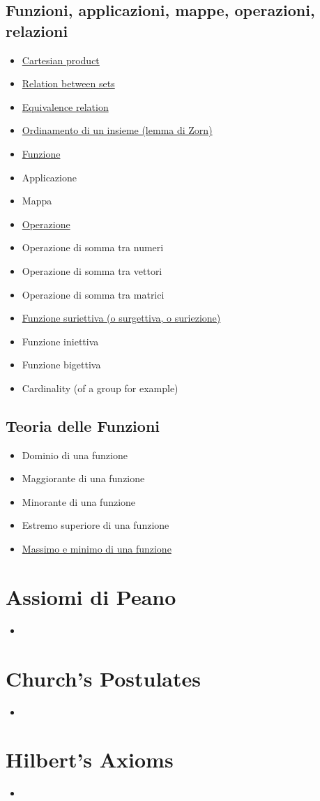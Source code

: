 \documentclass[a4paper,10pt]{article}
\begin{document}
\subsection*{Funzioni, applicazioni, mappe, operazioni, relazioni}
\begin{itemize}
 \item \href{CartesianProduct.pdf}{Cartesian product}
 \item \href{Relation.pdf}{Relation between sets}
 \item \href{EquivalenceRelation.pdf}{Equivalence relation}
 \item \href{OrdinamentoInsieme.pdf}{Ordinamento di un insieme (lemma di Zorn)}
 \item \href{Function.pdf}{Funzione}
 \item Applicazione
 \item Mappa
 \item \href{Operazione.pdf}{Operazione}
 \item Operazione di somma tra numeri
 \item Operazione di somma tra vettori
 \item Operazione di somma tra matrici
 \item \href{./FunzioneSuriettiva.pdf}{Funzione suriettiva (o surgettiva, o suriezione)}
 \item Funzione iniettiva
 \item Funzione bigettiva
 \item Cardinality (of a group for example)
\end{itemize}

\subsection*{Teoria delle Funzioni}
\begin{itemize}
 \item Dominio di una funzione
 \item Maggiorante di una funzione
 \item Minorante di una funzione
 \item Estremo superiore di una funzione
 \item \href{FunzioneMassimoMinimo.pdf}{Massimo e minimo di una funzione}
\end{itemize}

\section{Assiomi di Peano}
\begin{itemize}
 \item 
\end{itemize}

\section{Church's Postulates}
\begin{itemize}
 \item 
\end{itemize}

\section{Hilbert's Axioms}
\begin{itemize}
 \item 
\end{itemize}
\end{document}
